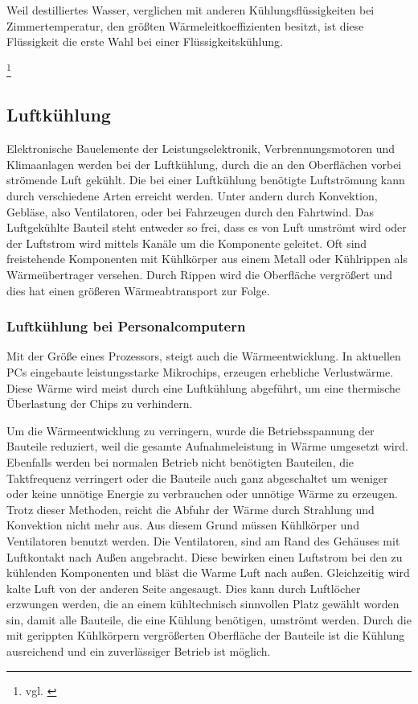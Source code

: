 Weil destilliertes Wasser, verglichen mit anderen Kühlungsflüssigkeiten bei Zimmertemperatur, den größten Wärmeleitkoeffizienten besitzt, ist diese Flüssigkeit die erste Wahl bei einer Flüssigkeitskühlung.

\footnote{vgl. \cite{Wasserkuehlung}}
\newpage

\subsection{Luftkühlung} 

Elektronische Bauelemente der Leistungselektronik, Verbrennungsmotoren und Klimaanlagen werden bei der Luftkühlung, durch die an den Oberflächen vorbei strömende Luft gekühlt.
Die bei einer Luftkühlung benötigte Luftströmung kann durch verschiedene Arten erreicht werden. Unter andern durch Konvektion, Gebläse, also Ventilatoren, oder bei Fahrzeugen durch den Fahrtwind. 
Das Luftgekühlte Bauteil steht entweder so frei, dass es von Luft umströmt wird oder der Luftstrom wird mittels Kanäle um die Komponente geleitet. Oft sind freistehende Komponenten mit Kühlkörper aus einem Metall oder Kühlrippen als Wärmeübertrager versehen. Durch Rippen wird die Oberfläche vergrößert und dies hat einen größeren Wärmeabtransport zur Folge.

\subsubsection{Luftkühlung bei Personalcomputern}

Mit der Größe eines Prozessors, steigt auch die Wärmeentwicklung. In aktuellen PCs eingebaute leistungsstarke Mikrochips, erzeugen erhebliche Verlustwärme. Diese Wärme wird meist durch eine Luftkühlung abgeführt, um eine thermische Überlastung der Chips zu verhindern.

Um die Wärmeentwicklung zu verringern, wurde die Betriebsspannung der Bauteile reduziert, weil die gesamte Aufnahmeleistung in Wärme umgesetzt wird. Ebenfalls werden bei normalen Betrieb nicht benötigten Bauteilen, die Taktfrequenz verringert oder die Bauteile auch ganz abgeschaltet um weniger oder keine unnötige Energie zu verbrauchen oder unnötige Wärme zu erzeugen. Trotz dieser Methoden, reicht die Abfuhr der Wärme durch Strahlung und Konvektion nicht mehr aus.
Aus diesem Grund müssen Kühlkörper und Ventilatoren benutzt werden. Die Ventilatoren, sind am Rand des Gehäuses mit Luftkontakt nach Außen angebracht. Diese bewirken einen Luftstrom bei den zu kühlenden Komponenten und bläst die Warme Luft nach außen. Gleichzeitig wird kalte Luft von der anderen Seite angesaugt. Dies kann durch Luftlöcher erzwungen werden, die an einem kühltechnisch sinnvollen Platz gewählt worden sin, damit alle Bauteile, die eine Kühlung benötigen, umströmt werden.
Durch die mit gerippten Kühlkörpern vergrößerten Oberfläche der Bauteile ist die Kühlung ausreichend und ein zuverlässiger Betrieb ist möglich. 

